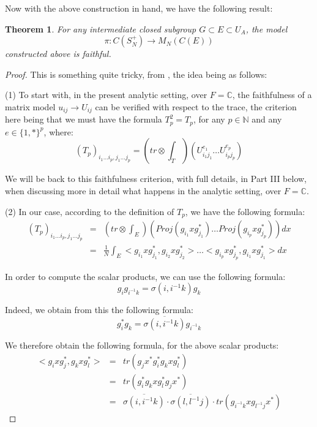 \documentclass[12pt]{amsbook}
\newtheorem{theorem}{Theorem}[chapter]
\begin{document}
Now with the above construction in hand, we have the following result:

\begin{theorem}
For any intermediate closed subgroup $G\subset E\subset U_A$, the model 
$$\pi:C(S_N^+)\to M_N(C(E))$$
constructed above is faithful.
\end{theorem}

\begin{proof}
This is something quite tricky, from \cite{bne}, the idea being as follows:

\medskip

(1) To start with, in the present analytic setting, over $F=\mathbb C$, the faithfulness of a matrix model $u_{ij}\to U_{ij}$ can be verified with respect to the trace, the criterion here being that we must have the formula $T_p^2=T_p$, for any $p\in\mathbb N$ and any $e\in\{1,*\}^p$, where:
$$(T_p)_{i_1\ldots i_p,j_1\ldots j_p}=\left(tr\otimes\int_T\right)(U_{i_1j_1}^{e_1}\ldots U_{i_pj_p}^{e_p})$$

We will be back to this faithfulness criterion, with full details, in Part III below, when discussing more in detail what happens in the analytic setting, over $F=\mathbb C$.

\medskip

(2) In our case, according to the definition of $T_p$, we have the following formula:
\begin{eqnarray*}
(T_p)_{i_1\ldots i_p,j_1\ldots j_p}
&=&\left(tr\otimes\int_E\right)\left(Proj(g_{i_1}xg_{j_1}^*)\ldots Proj(g_{i_p}xg_{j_p}^*)\right)dx\\
&=&\frac{1}{N}\int_E<g_{i_1}xg_{j_1}^*,g_{i_2}xg_{j_2}^*>\ldots<g_{i_p}xg_{j_p}^*,g_{i_1}xg_{j_1}^*>dx
\end{eqnarray*}

In order to compute the scalar products, we can use the following formula:
$$g_ig_{i^{-1}k}=\sigma(i,i^{-1}k)g_k$$

Indeed, we obtain from this the following formula:
$$g_i^*g_k=\overline{\sigma(i,i^{-1}k)}g_{i^{-1}k}$$

We therefore obtain the following formula, for the above scalar products:
\begin{eqnarray*}
<g_ixg_j^*,g_kxg_l^*>
&=&tr(g_jx^*g_i^*g_kxg_l^*)\\
&=&tr(g_i^*g_kxg_l^*g_jx^*)\\
&=&\overline{\sigma(i,i^{-1}k)}\cdot\overline{\sigma(l,l^{-1}j)}\cdot tr(g_{i^{-1}k}xg_{l^{-1}j}x^*)
\end{eqnarray*}


\end{proof}
\end{document}

